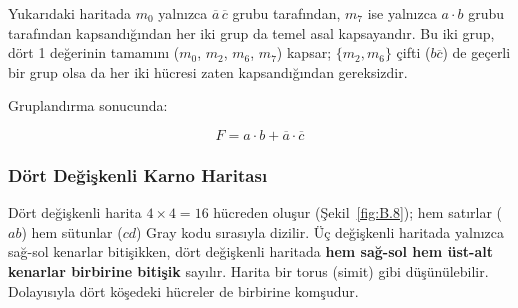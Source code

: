 \begin{ornek}[B.5]
Yukarıdaki haritada $m_0$ yalnızca $\overline{a}\,\overline{c}$ grubu tarafından, $m_7$ ise yalnızca $a \cdot b$ grubu tarafından kapsandığından her iki grup da temel asal kapsayandır. Bu iki grup, dört 1 değerinin tamamını ($m_0$, $m_2$, $m_6$, $m_7$) kapsar; $\{m_2, m_6\}$ çifti ($b\overline{c}$) de geçerli bir grup olsa da her iki hücresi zaten kapsandığından gereksizdir.

Gruplandırma sonucunda:

\[
    F = a \cdot b + \overline{a} \cdot \overline{c}
\]
\end{ornek}

\subsubsection{Dört Değişkenli Karno Haritası}

Dört değişkenli harita $4 \times 4 = 16$ hücreden oluşur (Şekil~\ref{fig:B.8}); hem satırlar ($ab$) hem sütunlar ($cd$) Gray kodu sırasıyla dizilir. Üç değişkenli haritada yalnızca sağ-sol kenarlar bitişikken, dört değişkenli haritada \textbf{hem sağ-sol hem üst-alt kenarlar birbirine bitişik} sayılır. Harita bir torus (simit) gibi düşünülebilir. Dolayısıyla dört köşedeki hücreler de birbirine komşudur.


